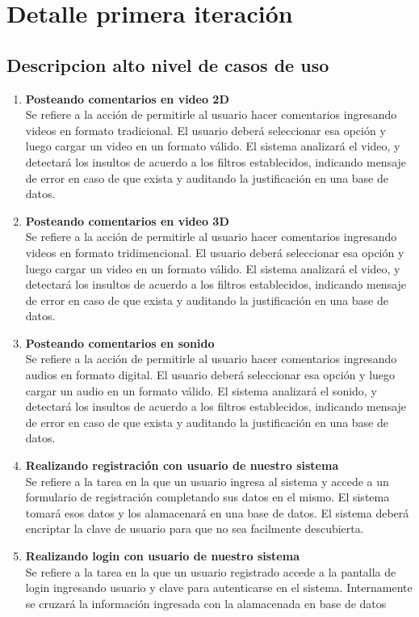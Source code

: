 \section{Detalle primera iteración}

\subsection{Descripcion alto nivel de casos de uso}

\begin{enumerate}
    \item {\bf{Posteando comentarios en video 2D}}\\
    Se refiere a la acción de permitirle al usuario hacer comentarios ingresando videos en formato tradicional.
    El usuario deberá seleccionar esa opción y luego cargar un video en un formato válido. El sistema analizará el video,
    y detectará los insultos de acuerdo a los filtros establecidos, indicando mensaje de error en caso de que exista y 
    auditando la justificación en una base de datos.
    \item {\bf{Posteando comentarios en video 3D}}\\
    Se refiere a la acción de permitirle al usuario hacer comentarios ingresando videos en formato tridimencional.
    El usuario deberá seleccionar esa opción y luego cargar un video en un formato válido. El sistema analizará el video,
    y detectará los insultos de acuerdo a los filtros establecidos, indicando mensaje de error en caso de que exista y 
    auditando la justificación en una base de datos.
    \item {\bf{Posteando comentarios en sonido}} \\
    Se refiere a la acción de permitirle al usuario hacer comentarios ingresando audios en formato digital.
    El usuario deberá seleccionar esa opción y luego cargar un audio en un formato válido. El sistema analizará el sonido,
    y detectará los insultos de acuerdo a los filtros establecidos, indicando mensaje de error en caso de que exista y 
    auditando la justificación en una base de datos.
    \item {\bf{Realizando registración con usuario de nuestro sistema}} \\
    Se refiere a la tarea en la que un usuario ingresa al sistema y accede a un formulario de registración completando sus
    datos en el mismo. El sistema tomará esos datos y los alamacenará en una base de datos. El sistema deberá encriptar la 
    clave de usuario para que no sea facilmente descubierta.
    \item {\bf{Realizando login con usuario de nuestro sistema}} \\
    Se refiere a la tarea en la que un usuario registrado accede a la pantalla de login ingresando usuario y clave para 
    autenticarse en el sistema. Internamente se cruzará la información ingresada con la alamacenada en base de datos
     

\end{enumerate}
